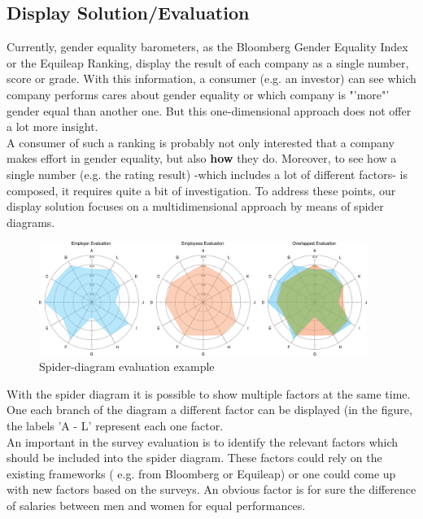 \documentclass[portrait,a4paper]{article}
\begin{document}
	\subsection{Display Solution/Evaluation}
		Currently, gender equality barometers, as the Bloomberg Gender Equality Index or the Equileap Ranking, 
		display the result of each company as a single number, score or grade. With this information, 
		a consumer (e.g. an investor) can see which company performs cares about gender equality or which 
		company is "'more"' gender equal than another one. But this one-dimensional approach does not offer 
		a lot more insight.\\
		A consumer of such a ranking is probably not only interested that a company makes effort 
		in gender equality, but also \textbf{how} they do.
		Moreover, to see how a single number (e.g. the rating result) -which includes a lot of different factors- is composed, 
		it requires quite a bit of investigation.
		To address these points, our display solution focuses on a multidimensional approach by means of spider diagrams.
		\begin{figure}[H]
			\includegraphics[width=0.95\textwidth]{Bilder/spider-eval}
			\caption{Spider-diagram evaluation example}
			\label{Spider_diagram_evaluation__}
		\end{figure}

		With the spider diagram it is possible to show multiple factors at the same time. One each branch of the 
		diagram a different factor can be displayed (in the figure, the labels 'A - L' represent each one factor.\\
		An important in the survey evaluation is to identify the relevant factors which should be included 
		into the spider diagram. These factors could rely on the existing frameworks ( e.g. from Bloomberg or Equileap) 
		or one could come up with new factors based on the surveys. An obvious factor is for sure the 
		difference of salaries between men and women for equal performances.\\
 
\end{document}
